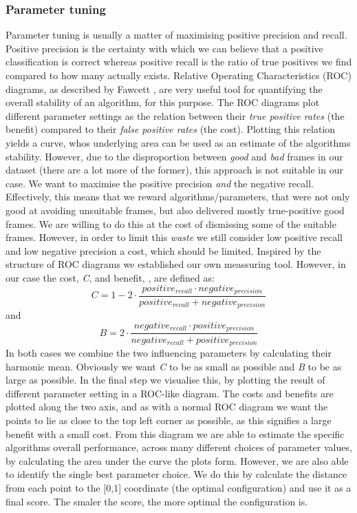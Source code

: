 \subsubsection{Parameter tuning} \label{sec:ph1tweaking}
%
Parameter tuning is usually a matter of maximising positive precision and recall. Positive precision is the certainty with which we can believe that a positive classification is correct whereas positive recall is the ratio of true positives we find compared to how many actually exists. Relative Operating Characteristics (ROC) diagrams, as described by Fawcett \cite{Fawcett06a}, are very useful tool for quantifying the overall stability of an algorithm, for this purpose. The ROC diagrams plot different parameter settings as the relation between their \textit{true positive rates} (the benefit) compared to their \textit{false positive rates} (the cost). Plotting this relation yields a curve, whos underlying area can be used as an estimate of the algorithms stability.
However, due to the disproportion between \textit{good} and \textit{bad} frames in our dataset (there are a lot more of the former), this approach is not suitable in our case. We want to maximise the positive precision \textit{and} the negative recall. Effectively, this means that we reward algorithms/parameters, that were not only good at avoiding unsuitable frames, but also delivered mostly true-positive good frames. We are willing to do this at the cost of dismissing some of the suitable frames. However, in order to limit this \textit{waste} we still consider low positive recall and low negative precision a cost, which should be limited. Inspired by the structure of ROC diagrams we established our own meassuring tool. However, in our case the cost, \textit{C}, and benefit, , are defined as:
\[
C = 1 - 2 \cdot \frac{positive_{recall} \cdot negative_{precision}}{positive_{recall} + negative_{precision}}
\]
and
\[
B = 2 \cdot \frac{negative_{recall} \cdot positive_{precision}}{negative_{recall} + positive_{precision}}
\]
In both cases we combine the two influencing parameters by calculating their harmonic mean. Obviously we want \textit{C} to be as small as possible and \textit{B} to be as large as possible. In the final step we visualise this, by plotting the result of different parameter setting in a ROC-like diagram. The costs and benefits are plotted along the two axis, and as with a normal ROC diagram we want the points to lie as close to the top left corner as possible, as this signifies a large benefit with a small cost. From this diagram we are able to estimate the specific algorithms overall performance, across many different choices of parameter values, by calculating the area under the curve the plots form. However, we are also able to identify the single best parameter choice. We do this by calculate the distance from each point to the [0,1] coordinate (the optimal configuration) and use it as a final score. The smaler the score, the more optimal the configuration is.\\\\
